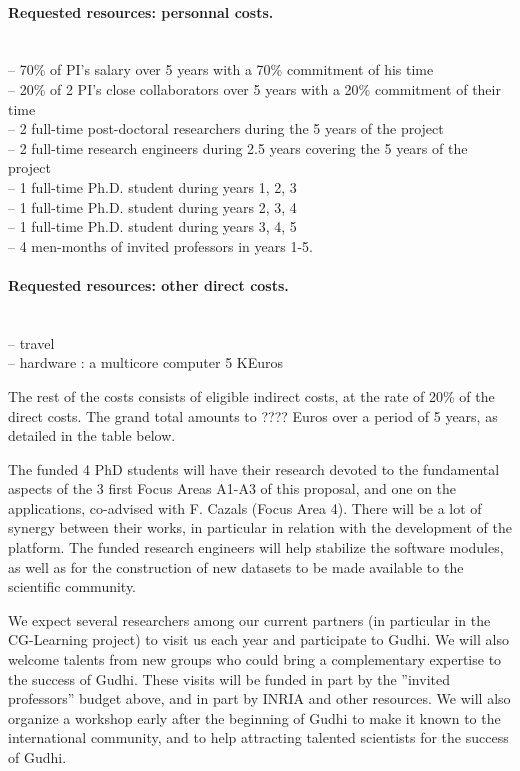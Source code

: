 \paragraph{Requested resources: personnal costs.}\mbox{}\\
-- 70\% of PI's salary over 5 years with a 70\% commitment of his time\\
-- 20\% of 2 PI's close collaborators over 5 years with a 20\% commitment of their time\\
-- 2 full-time post-doctoral researchers during the 5 years of the project\\
-- 2 full-time research engineers during 2.5 years covering the 5 years of the project\\
-- 1 full-time Ph.D. student during years 1, 2, 3\\
-- 1 full-time Ph.D. student during years 2, 3, 4\\
-- 1 full-time Ph.D. student during years 3, 4, 5\\
-- 4 men-months of invited professors in years 1-5.

\paragraph{Requested resources: other direct costs.}\mbox{}\\
-- travel \\
-- hardware : a multicore computer 5 KEuros

The rest of the costs consists of eligible indirect costs, at the rate of 20\% of the direct costs. 
The grand total amounts to ???? Euros over a period of 5 years, as detailed in the table below.


The funded 4 PhD students will have their research devoted to the fundamental aspects of the 3 first Focus Areas A1-A3 of this proposal, and one on the applications, co-advised with F. Cazals  (Focus Area 4). There will be a lot of synergy between their works, in particular in relation with the development of the platform. The funded research engineers  will help stabilize the software modules, as well as for the construction of new datasets to be made available to the scientific community.

We expect several researchers among our current partners (in particular in the CG-Learning project) to visit us each year and participate to Gudhi. We will also welcome talents from new groups who could bring a complementary expertise to the success of Gudhi. These visits will be funded in part by the ”invited professors” budget above, and in part by INRIA and other resources.
We will also organize a workshop early after the beginning of Gudhi to make it known to the international community, and to help attracting talented scientists for the success of Gudhi.

\newpage

{\small%
%


}

